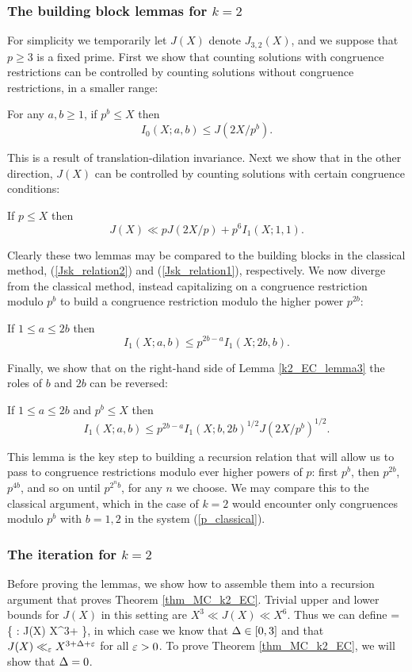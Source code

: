 \documentclass[brochure,english,12pt]{bourbaki}%
\begin{document}
 \subsubsection{The building block lemmas for $k=2$}
For simplicity we temporarily let $J(X)$ denote $J_{3,2}(X)$, and we suppose that $p \geq 3$ is a fixed prime.
First we show that counting solutions with congruence restrictions can be controlled by counting solutions without congruence restrictions, in a smaller range:
\begin{lemm}\label{k2_EC_lemma1}
For any $a,b \geq 1$, if $p^b \leq X$ then 
\[ I_0(X;a,b) \leq J(2X/p^b).\]
\end{lemm}
This is a result of translation-dilation invariance.
Next we show that in the other direction, $J(X)$ can be controlled by counting solutions with certain congruence conditions:
\begin{lemm}\label{k2_EC_lemma2}
If $p\leq X$ then
\[J(X) \ll p J(2X/p) + p^6 I_1(X;1,1).\]
\end{lemm}
Clearly these two lemmas may be compared to the building blocks in the classical method, (\ref{Jsk_relation2}) and  (\ref{Jsk_relation1}), respectively.
We now diverge from the classical method, instead capitalizing on a congruence restriction modulo $p^b$ to build a congruence restriction modulo the higher power $p^{2b}$:
\begin{lemm}\label{k2_EC_lemma3}
If $1 \leq a \leq 2b$  then 
\[ I_1(X;a,b) \leq p^{2b-a} I_1(X;2b,b).\]
\end{lemm}

Finally, we show that on the right-hand side of Lemma \ref{k2_EC_lemma3} the roles of $b$ and $2b$ can be reversed:
\begin{lemm}\label{k2_EC_lemma4}
If $1 \leq a \leq 2b$ and $p^b \leq X$ then 
\[ I_1(X;a,b) \leq p^{2b-a} I_1(X;b,2b)^{1/2} J(2X/p^b)^{1/2}.\]
\end{lemm}
This lemma is the key step to building a recursion relation that will allow us to pass to congruence restrictions modulo ever higher powers of $p$: first $p^b$, then $p^{2b}$, $p^{4b}$, and so on until $p^{2^nb}$, for any $n$ we choose. We may compare this to the classical argument, which in the case of $k=2$ would encounter only congruences modulo  $p^b$ with $b=1,2$ in the system (\ref{p_classical}).


\subsubsection{The iteration for $k=2$}
Before proving the lemmas, we show how to assemble them into a recursion argument that proves Theorem \ref{thm_MC_k2_EC}. Trivial upper and lower bounds for $J(X)$ in this setting are $X^3 \ll J(X) \ll X^6$. Thus we can define 
\beq\label{Delta_dfn_k2_EC}
 \Delta = \inf \{ \del \in \R : J(X) \ll X^{3+\del} \;  \},
 \eeq
in which case we know that $\Delta \in [0,3]$ and that $J(X) \ll_\varepsilon X^{3+\Delta+\varepsilon}$ for all $\varepsilon>0$. To prove Theorem \ref{thm_MC_k2_EC}, we will show that $\Delta=0$.
\end{document}
